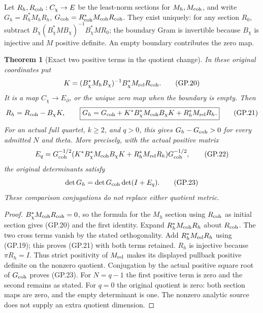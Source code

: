 \documentclass[11pt]{article}
\newtheorem{theorem}{Theorem}
\begin{document}
Let $R_h,R_{\rm coh}:C_\chi\to E$ be the least-norm sections for
$M_h,M_{\rm coh}$, and write $G_h=R_h^*M_hR_h$,
$G_{\rm coh}=R_{\rm coh}^*M_{\rm coh}R_{\rm coh}$. They exist uniquely:
for any section $R_0$, subtract
$B_\chi(B_\chi^*MB_\chi)^{-1}B_\chi^*MR_0$; the boundary Gram
is invertible because $B_\chi$ is injective and $M$ positive definite.
An empty boundary contributes the zero map.
\begin{theorem}[Exact two positive terms in the quotient change]
In these original coordinates put
\begin{equation}
 K=(B_\chi^*M_hB_\chi)^{-1}B_\chi^*M_{\rm rel}R_{\rm coh}.
 \tag{GP.20}
\end{equation}
It is a map $C_\chi\to E_\partial$, or the unique zero map when
the boundary is empty. Then
\begin{equation}
 R_h=R_{\rm coh}-B_\chi K,\qquad
 \boxed{G_h=G_{\rm coh}
       +K^*B_\chi^*M_{\rm coh}B_\chi K
       +R_h^*M_{\rm rel}R_h.}
 \tag{GP.21}
\end{equation}
For an actual full quartet, $k\geq2$, and $q>0$, this gives
$G_h-G_{\rm coh}>0$ for every admitted $N$ and theta. More precisely,
with the actual positive matrix
\begin{equation}
 E_q=G_{\rm coh}^{-1/2}
 (K^*B_\chi^*M_{\rm coh}B_\chi K+R_h^*M_{\rm rel}R_h)
 G_{\rm coh}^{-1/2},
 \tag{GP.22}
\end{equation}
the original determinants satisfy
\begin{equation}
 \det G_h=\det G_{\rm coh}\det(I+E_q).
 \tag{GP.23}
\end{equation}
These comparison conjugations do not replace either quotient metric.
\end{theorem}
\begin{proof}
$B_\chi^*M_{\rm coh}R_{\rm coh}=0$, so the formula for the
$M_h$ section using $R_{\rm coh}$ as initial section gives (GP.20)
and the first identity. Expand
$R_h^*M_{\rm coh}R_h$ about $R_{\rm coh}$. The two cross terms
vanish by the stated orthogonality. Add $R_h^*M_{\rm rel}R_h$
using (GP.19); this proves (GP.21) with both terms retained.
$R_h$ is injective because $\pi R_h=I$. Thus strict positivity
of $M_{\rm rel}$ makes its displayed pullback positive definite
on the nonzero quotient. Conjugation by the actual positive square
root of $G_{\rm coh}$ proves (GP.23). For $N=q-1$ the first
positive term is zero and the second remains as stated. For $q=0$
the original quotient is zero: both section maps are zero, and the
empty determinant is one. The nonzero analytic source does not
supply an extra quotient dimension.
\end{proof}
\end{document}
